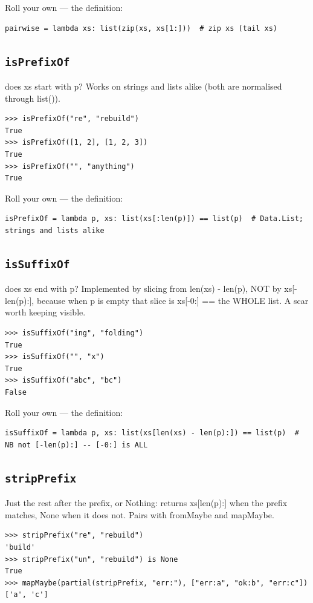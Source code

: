 \documentclass[10pt,letterpaper]{book}
\begin{document}
Roll your own --- the definition:

\begin{lstlisting}[style=ex]
pairwise = lambda xs: list(zip(xs, xs[1:]))  # zip xs (tail xs)
\end{lstlisting}

\subsection{\texttt{isPrefixOf}}\label{def:isPrefixOf}
does xs start with p? Works on strings and lists alike (both are normalised through list()).
\begin{lstlisting}[style=ex]
>>> isPrefixOf("re", "rebuild")
True
>>> isPrefixOf([1, 2], [1, 2, 3])
True
>>> isPrefixOf("", "anything")
True
\end{lstlisting}

Roll your own --- the definition:

\begin{lstlisting}[style=ex]
isPrefixOf = lambda p, xs: list(xs[:len(p)]) == list(p)  # Data.List; strings and lists alike
\end{lstlisting}
\subsection{\texttt{isSuffixOf}}\label{def:isSuffixOf}
does xs end with p? Implemented by slicing from len(xs) - len(p), NOT by xs[-len(p):], because when p is empty that slice is xs[-0:] == the WHOLE list. A scar worth keeping visible.
\begin{lstlisting}[style=ex]
>>> isSuffixOf("ing", "folding")
True
>>> isSuffixOf("", "x")
True
>>> isSuffixOf("abc", "bc")
False
\end{lstlisting}

Roll your own --- the definition:

\begin{lstlisting}[style=ex]
isSuffixOf = lambda p, xs: list(xs[len(xs) - len(p):]) == list(p)  # NB not [-len(p):] -- [-0:] is ALL
\end{lstlisting}
\subsection{\texttt{stripPrefix}}\label{def:stripPrefix}
Just the rest after the prefix, or Nothing: returns xs[len(p):] when the prefix matches, None when it does not. Pairs with fromMaybe and mapMaybe.
\begin{lstlisting}[style=ex]
>>> stripPrefix("re", "rebuild")
'build'
>>> stripPrefix("un", "rebuild") is None
True
>>> mapMaybe(partial(stripPrefix, "err:"), ["err:a", "ok:b", "err:c"])
['a', 'c']
\end{lstlisting}
\end{document}
